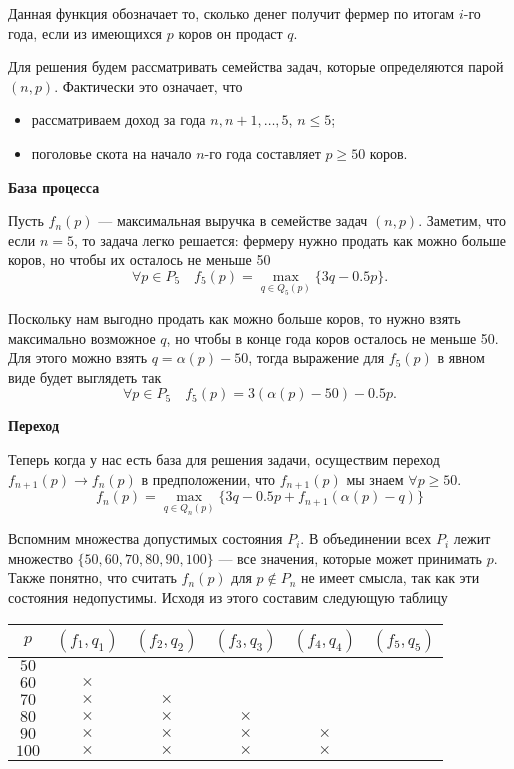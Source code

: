 Данная функция обозначает то, сколько денег получит фермер по итогам $i$-го года, если из имеющихся $p$ коров он продаст $q$. 

\bigskip

Для решения будем рассматривать семейства задач, которые определяются парой $(n, p)$. Фактически это означает, что

\begin{itemize}[nosep]
	\item рассматриваем доход за года $n, n+1, \dots, 5$, $n \le 5$;
	
	\item поголовье скота на начало $n$-го года составляет $p \ge 50$ коров.
\end{itemize}

\bigskip

\textbf{База процесса}

Пусть $f_n(p)$ --- максимальная выручка в семействе задач $(n, p)$. Заметим, что если $n = 5$, то задача легко решается: фермеру нужно продать как можно больше коров, но чтобы их осталось не меньше 50
\[
\forall p \in P_5 \quad f_5(p) = \max_{q \in Q_5(p)} \{3q - 0.5p\}.
\]

Поскольку нам выгодно продать как можно больше коров, то нужно взять максимально возможное $q$, но чтобы в конце года коров осталось не меньше 50. Для этого можно взять $q = \alpha(p) - 50$, тогда выражение для $f_5(p)$ в явном виде будет выглядеть так
\[
\forall p \in P_5 \quad f_5(p) = 3(\alpha(p) - 50) - 0.5p.
\]

\bigskip

\textbf{Переход}

Теперь когда у нас есть база для решения задачи, осуществим переход $f_{n+1}(p) \to f_n(p)$ в предположении, что $f_{n+1}(p)$ мы знаем $\forall p \ge 50$.
\[
\boxed{f_n(p) = \max_{q \in Q_n(p)} \Big\{3q - 0.5p + f_{n + 1}(\alpha(p) - q)\Big\}}\tag{**}
\]

Вспомним множества допустимых состояния $P_i$. В объединении всех $P_i$ лежит множество $\{50, 60, 70, 80, 90, 100\}$ --- все значения, которые может принимать $p$. Также понятно, что считать $f_n(p)$ для $p \notin P_n$ не имеет смысла, так как эти состояния недопустимы. Исходя из этого составим следующую таблицу

\begin{table}[H]
	\centering
	\begin{tabular}{ | c | c | c | c | c | c | } 
		\hline
		$p$ & $(f_1, q_1)$ & $(f_2, q_2)$ & $(f_3, q_3)$ & $(f_4, q_4)$ & $(f_5, q_5)$ \\ 
		\hline
		$50$ & & & & & \\\hline
		$60$ & $\times$ & & & & \\\hline
		$70$ & $\times$ & $\times$ & & & \\\hline
		$80$ & $\times$ & $\times$ & $\times$ & & \\\hline
		$90$ & $\times$ & $\times$ & $\times$ & $\times$ & \\\hline
		$100$ & $\times$ & $\times$ & $\times$ & $\times$ & \\\hline
	\end{tabular}
\end{table}

